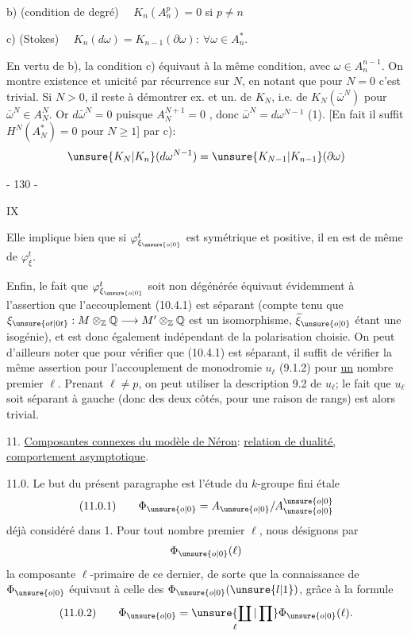 b) (condition de degré) $\quad K_n(A_n^p)=0$ si $p\ne n$

c) (Stokes) $\quad K_n(d\omega)=K_{n-1}(\partial\omega):
\ \forall\omega\in A_n^*$.

En vertu de b), la condition c) équivaut à la même
condition, avec $\omega\in A_n^{n-1}$. On montre existence et
unicité par  récurrence sur $N$,
en notant que pour $N=0$ c'est trivial.
Si $N>0$, 
il reste à démontrer ex. et un. de $K_N$, i.e. de
$K_N(\bar\omega^N)$ pour $\bar\omega^N\in A_N^N$.
Or $d\bar\omega^N=0$ puisque $A_N^{N+1}=0$
, donc $\bar\omega^N=d\omega^{N-1}$ (1).
[En fait il suffit  $H^N(A_N^*)=0$ pour $N\geq1$]
 \uline{} par c):
\[
\unsure{K_N|K_n}(d\omega^{N-1})=\unsure{K_{N-1}|K_{n-1}}(\partial\omega)
\]

\begin{center}- 130 -\end{center}
\begin{flushright}IX\end{flushright}

Elle implique bien que si $\varphi^t_{\xi_{\unsure{o|0}}}$ est symétrique et positive, il en est de même de $\varphi^t_\xi$.

Enfin, le fait que $\varphi^t_{\xi_{\unsure{o|0}}}$ soit non dégénérée équivaut évidemment à l'assertion que l'accouplement (10.4.1) est séparant (compte tenu que
$\xi_{\unsure{ot|0t}}:M\otimes_{\mathbb Z}\mathbb Q\longrightarrow M'\otimes_{\mathbb Z}\mathbb Q$
est un isomorphisme, $\widetilde\xi_{\unsure{o|0}}$ étant une isogénie), et est donc également indépendant de la polarisation choisie. On peut d'ailleurs noter que pour vérifier que (10.4.1) est séparant, il suffit de vérifier la même assertion pour l'accouplement de monodromie $u_\ell$ (9.1.2) pour \uline{un} nombre premier $\ell$. Prenant $\ell\ne p$, on peut utiliser la description 9.2 de $u_\ell$; le fait que $u_\ell$ soit séparant à gauche (donc des deux côtés, pour une raison de rangs) est alors trivial.

11. \uline{Composantes connexes du modèle de Néron}: \uline{relation de dualité, comportement asymptotique}.

11.0. Le but du présent paragraphe est l'étude du $k$-groupe fini étale
\[
\text{(11.0.1)}\qquad
\Phi_{\unsure{o|0}}=A_{\unsure{o|0}}/A_{\unsure{o|0}}^{\unsure{o|0}}
\]
déjà considéré dans 1. Pour tout nombre premier $\ell$, nous désignons par
\[
\Phi_{\unsure{o|0}}(\ell)
\]
la composante $\ell$-primaire de ce dernier, de sorte que la connaissance de
$\Phi_{\unsure{o|0}}$ équivaut à celle des
$\Phi_{\unsure{o|0}}(\unsure{l|1})$, grâce à la formule
\[
\text{(11.0.2)}\qquad
\Phi_{\unsure{o|0}}=\underset{\ell}{\unsure{\coprod|\prod}}\Phi_{\unsure{o|0}}(\ell).
\]

